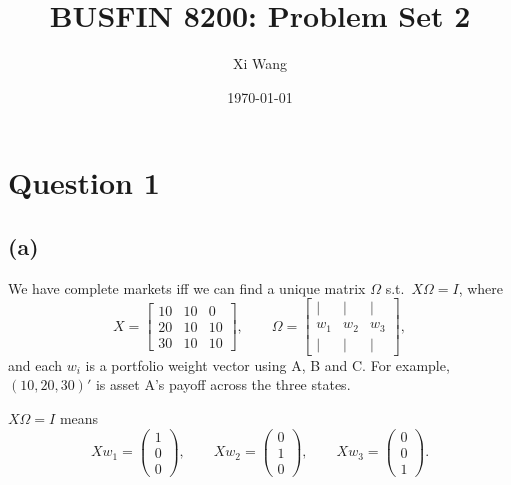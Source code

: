 \documentclass[11pt]{article}
\title{BUSFIN 8200: Problem Set 2}
\author{Xi Wang}
\date{\today}
\begin{document}
\maketitle

\section*{Question 1}

\subsection*{(a)}

We have complete markets iff we can find a unique matrix $\Omega$ s.t.\ $X\Omega = I$, where
\[
X = \begin{bmatrix} 10 & 10 & 0 \\ 20 & 10 & 10 \\ 30 & 10 & 10 \end{bmatrix}, \qquad
\Omega = \begin{bmatrix} | & | & | \\ w_1 & w_2 & w_3 \\ | & | & | \end{bmatrix},
\]
and each $w_i$ is a portfolio weight vector using A, B and C. For example, $(10, 20, 30)'$ is asset A's payoff across the three states.

$X\Omega = I$ means
\[
X w_1 = \begin{pmatrix} 1 \\ 0 \\ 0 \end{pmatrix}, \qquad
X w_2 = \begin{pmatrix} 0 \\ 1 \\ 0 \end{pmatrix}, \qquad
X w_3 = \begin{pmatrix} 0 \\ 0 \\ 1 \end{pmatrix}.
\]
\end{document}
